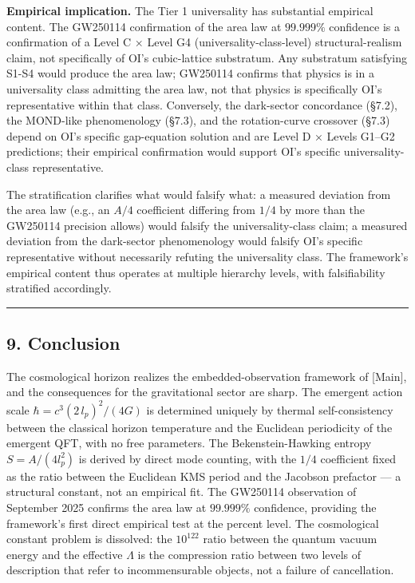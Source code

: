 \documentclass[
]{article}
\begin{document}
\textbf{Empirical implication.} The Tier 1 universality has substantial
empirical content. The GW250114 confirmation of the area law at
\(99.999\%\) confidence is a confirmation of a Level C × Level G4
(universality-class-level) structural-realism claim, not specifically of
OI's cubic-lattice substratum. Any substratum satisfying S1-S4 would
produce the area law; GW250114 confirms that physics is in a
universality class admitting the area law, not that physics is
specifically OI's representative within that class. Conversely, the
dark-sector concordance (§7.2), the MOND-like phenomenology (§7.3), and
the rotation-curve crossover (§7.3) depend on OI's specific gap-equation
solution and are Level D × Levels G1--G2 predictions; their empirical
confirmation would support OI's specific universality-class
representative.

The stratification clarifies what would falsify what: a measured
deviation from the area law (e.g., an \(A/4\) coefficient differing from
\(1/4\) by more than the GW250114 precision allows) would falsify the
universality-class claim; a measured deviation from the dark-sector
phenomenology would falsify OI's specific representative without
necessarily refuting the universality class. The framework's empirical
content thus operates at multiple hierarchy levels, with falsifiability
stratified accordingly.

\begin{center}\rule{0.5\linewidth}{0.5pt}\end{center}

\hypertarget{conclusion}{%
\subsection{9. Conclusion}\label{conclusion}}

The cosmological horizon realizes the embedded-observation framework of
{[}Main{]}, and the consequences for the gravitational sector are sharp.
The emergent action scale \(\hbar = c^3 (2\,l_p)^2 / (4G)\) is
determined uniquely by thermal self-consistency between the classical
horizon temperature and the Euclidean periodicity of the emergent QFT,
with no free parameters. The Bekenstein-Hawking entropy
\(S = A/(4 l_p^2)\) is derived by direct mode counting, with the \(1/4\)
coefficient fixed as the ratio between the Euclidean KMS period and the
Jacobson prefactor --- a structural constant, not an empirical fit. The
GW250114 observation of September 2025 confirms the area law at
\(99.999\%\) confidence, providing the framework's first direct
empirical test at the percent level. The cosmological constant problem
is dissolved: the \(10^{122}\) ratio between the quantum vacuum energy
and the effective \(\Lambda\) is the compression ratio between two
levels of description that refer to incommensurable objects, not a
failure of cancellation.
\end{document}
